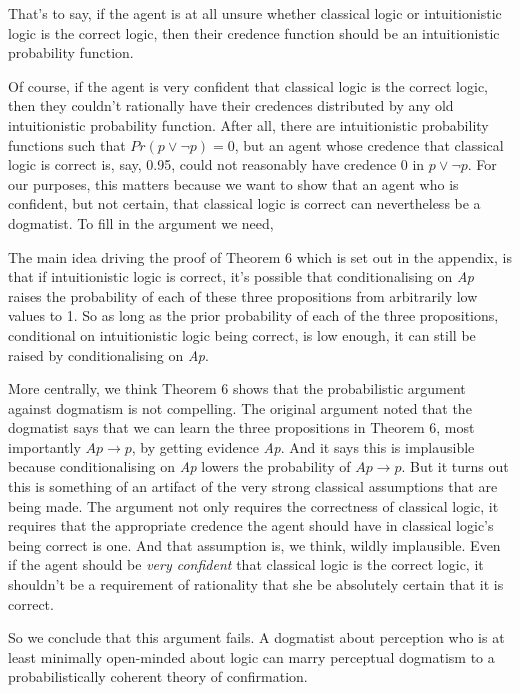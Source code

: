 \TheoremFive

\noindent That's to say, if the agent is at all unsure whether classical logic or intuitionistic logic is the correct logic, then their credence function should be an intuitionistic probability function. 

Of course, if the agent is very confident that classical logic is the correct logic, then they couldn't rationally have their credences distributed by any old intuitionistic probability function. After all, there are intuitionistic probability functions such that $Pr(p \vee \neg p) = 0$, but an agent whose credence that classical logic is correct is, say, 0.95, could not reasonably have credence 0 in $p \vee \neg p$. For our purposes, this matters because we want to show that an agent who is confident, but not certain, that classical logic is correct can nevertheless be a dogmatist. To fill in the argument we need,

\TheoremSix

\noindent The main idea driving the proof of Theorem 6 which is set out in the appendix, is that if intuitionistic logic is correct, it's possible that conditionalising on \emph{Ap} raises the probability of each of these three propositions from arbitrarily low values to 1. So as long as the prior probability of each of the three propositions, conditional on intuitionistic logic being correct, is low enough, it can still be raised by conditionalising on \emph{Ap}.

More centrally, we think Theorem 6 shows that the probabilistic argument against dogmatism is not compelling. The original argument noted that the dogmatist says that we can learn the three propositions in Theorem 6, most importantly $Ap \rightarrow p$, by getting evidence \emph{Ap}.  And it says this is implausible because conditionalising on \emph{Ap} lowers the probability of $Ap \rightarrow p$. But it turns out this is something of an artifact of the very strong classical assumptions that are being made. The argument not only requires the correctness of classical logic, it requires that the appropriate credence the agent should have in classical logic's being correct is one. And that assumption is, we think, wildly implausible. Even if the agent should be \textit{very confident} that classical logic is the correct logic, it shouldn't be a requirement of rationality that she be absolutely certain that it is correct.

So we conclude that this argument fails. A dogmatist about perception who is at least minimally open-minded about logic can marry perceptual dogmatism to a probabilistically coherent theory of confirmation.

